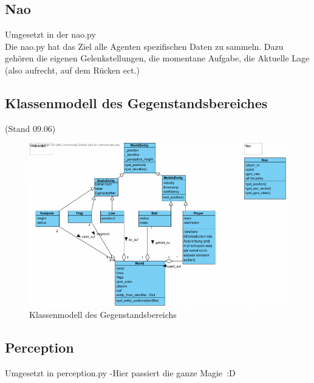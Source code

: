 \subsection{Nao}
Umgesetzt in der nao.py\\
Die nao.py hat das Ziel alle Agenten spezifischen Daten zu 
sammeln. Dazu gehören die eigenen Gelenkstellungen, die momentane 
Aufgabe, die Aktuelle Lage (also aufrecht, auf dem Rücken ect.)

\subsection{Klassenmodell des Gegenstandsbereiches}
(Stand 09.06)\\
\begin{figure}[h]
\begin{center}
\includegraphics[scale=0.6]{800px-Weltenmodell}
\end{center}
\caption{Klassenmodell des Gegenstandsbereichs}
\end{figure}


\subsection{Perception}
Umgesetzt in perception.py -Hier passiert die  ganze Magie~:D


